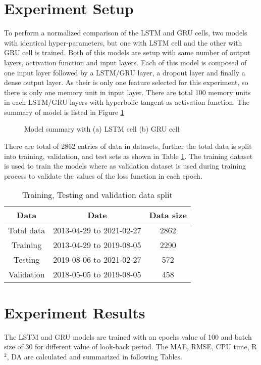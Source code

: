 \section{Experiment Setup}
To perform a normalized comparison of the LSTM and GRU cells, two models with identical hyper-parameters, but one with LSTM cell and the other with GRU cell is trained. Both of this models are setup with same number of output layers, activation function and input layers. Each of this model is composed of one input layer followed by a LSTM/GRU layer, a dropout layer and finally a dense output layer. As their is only one feature selected for this experiment, so there is only one memory unit in input layer. There are total 100 memory units in each LSTM/GRU layers with hyperbolic tangent as activation function. The summary of model is listed in Figure \ref{fig:summary}

\begin{figure}[h]
	\centering
	\caption{Model summary with (a) LSTM cell (b) GRU cell}
	\label{fig:summary}
\end{figure}

There are total of 2862 entries of data in datasets, further the total data is split into training, validation, and test sets as shown in Table \ref{table:dataset-split}. The training dataset is used to train the models where as validation dataset is used during training process to validate the values of the loss function in each epoch.

\begin{table}[h]
	\captionsetup{justification=centering}
	\caption{Training, Testing and validation data split}
	\centering
	\begin{tabular}{ c  c  c }
		\hline\hline
		Data & Date &  Data size \\ 
		\hline
		Total data & 2013-04-29 to 2021-02-27 & 2862 \\
		Training & 2013-04-29 to 2019-08-05 & 2290 \\
		Testing & 2019-08-06 to 2021-02-27 & 572 \\
		Validation & 2018-05-05 to 2019-08-05 & 458 \\
		\hline
	\end{tabular} 
	\label{table:dataset-split}
\end{table}


\section{Experiment Results}
The LSTM and GRU models are trained with an epochs value of 100 and batch size of 30 for different value of look-back period. The MAE, RMSE, CPU time, R$^2$, DA are calculated and summarized in following Tables.

